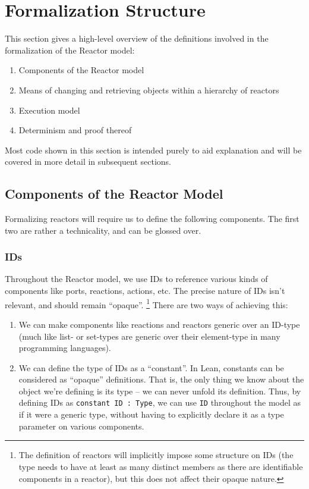 \section{Formalization Structure}

This section gives a high-level overview of the definitions involved in the formalization of the Reactor model:

\begin{enumerate}
    \item Components of the Reactor model
    \item Means of changing and retrieving objects within a hierarchy of reactors
    \item Execution model
    \item Determinism and proof thereof
\end{enumerate}

Most code shown in this section is intended purely to aid explanation and will be covered in more detail in subsequent sections.

\subsection{Components of the Reactor Model}

Formalizing reactors will require us to define the following components.
The first two are rather a technicality, and can be glossed over.

\subsubsection{IDs}

Throughout the Reactor model, we use IDs to reference various kinds of components like ports, reactions, actions, etc.
The precise nature of IDs isn't relevant, and should remain ``opaque''. \footnote{The definition of reactors will implicitly impose some structure on IDs (the type needs to have at least as many distinct members as there are identifiable components in a reactor), but this does not affect their opaque nature.}
There are two ways of achieving this:

\begin{enumerate}
    \item We can make components like reactions and reactors generic over an ID-type (much like list- or set-types are generic over their element-type in many programming languages).
    \item We can define the type of IDs as a ``constant''.
        In Lean, constants can be considered as ``opaque'' definitions. 
        That is, the only thing we know about the object we're defining is its type -- we can never unfold its definition.
        Thus, by defining IDs as \lstinline{constant ID : Type}, we can use \lstinline{ID} throughout the model as if it were a generic type, without having to explicitly declare it as a type parameter on various components.
\end{enumerate}

